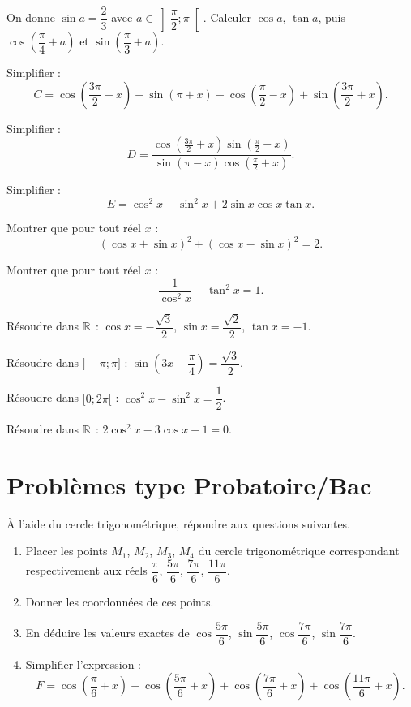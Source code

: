 \exo{}
On donne $\sin a = \dfrac{2}{3}$ avec $a \in \left]\dfrac{\pi}{2};\pi\right[$. Calculer $\cos a$, $\tan a$, puis $\cos\left(\dfrac{\pi}{4}+a\right)$ et $\sin\left(\dfrac{\pi}{3}+a\right)$.


\exo{}
Simplifier :
\[
C = \cos\left(\frac{3\pi}{2}-x\right) + \sin(\pi+x) - \cos\left(\frac{\pi}{2}-x\right) + \sin\left(\frac{3\pi}{2}+x\right).
\]

\exo{}
Simplifier :
\[
D = \frac{\cos\left(\frac{3\pi}{2}+x\right)\sin\left(\frac{\pi}{2}-x\right)}{\sin(\pi-x)\cos\left(\frac{\pi}{2}+x\right)}.
\]

\exo{}
Simplifier :
\[
E = \cos^2 x - \sin^2 x + 2\sin x \cos x \tan x.
\]

\exo{}
Montrer que pour tout réel $x$ :
\[
(\cos x + \sin x)^2 + (\cos x - \sin x)^2 = 2.
\]

\exo{}
Montrer que pour tout réel $x$ :
\[
\frac{1}{\cos^2 x} - \tan^2 x = 1.
\]


\exo{}
Résoudre dans $\mathbb{R}$ : $\cos x = -\dfrac{\sqrt{3}}{2}$, $\sin x = \dfrac{\sqrt{2}}{2}$, $\tan x = -1$.

\exo{}
Résoudre dans $]-\pi;\pi]$ : $\sin\left(3x-\dfrac{\pi}{4}\right) = \dfrac{\sqrt{3}}{2}$.

\exo{}
Résoudre dans $[0;2\pi[$ : $\cos^2 x - \sin^2 x = \dfrac{1}{2}$.

\exo{}
Résoudre dans $\mathbb{R}$ : $2\cos^2 x - 3\cos x + 1 = 0$.

\section{Problèmes type Probatoire/Bac}

\`A l'aide du cercle trigonométrique, répondre aux questions suivantes.
\begin{enumerate}[label=\arabic*)]
\item Placer les points $M_1$, $M_2$, $M_3$, $M_4$ du cercle trigonométrique correspondant respectivement aux réels $\dfrac{\pi}{6}$, $\dfrac{5\pi}{6}$, $\dfrac{7\pi}{6}$, $\dfrac{11\pi}{6}$.
\item Donner les coordonnées de ces points.
\item En déduire les valeurs exactes de $\cos\dfrac{5\pi}{6}$, $\sin\dfrac{5\pi}{6}$, $\cos\dfrac{7\pi}{6}$, $\sin\dfrac{7\pi}{6}$.
\item Simplifier l'expression :
\[
F = \cos\left(\frac{\pi}{6}+x\right) + \cos\left(\frac{5\pi}{6}+x\right) + \cos\left(\frac{7\pi}{6}+x\right) + \cos\left(\frac{11\pi}{6}+x\right).
\]
\end{enumerate}

